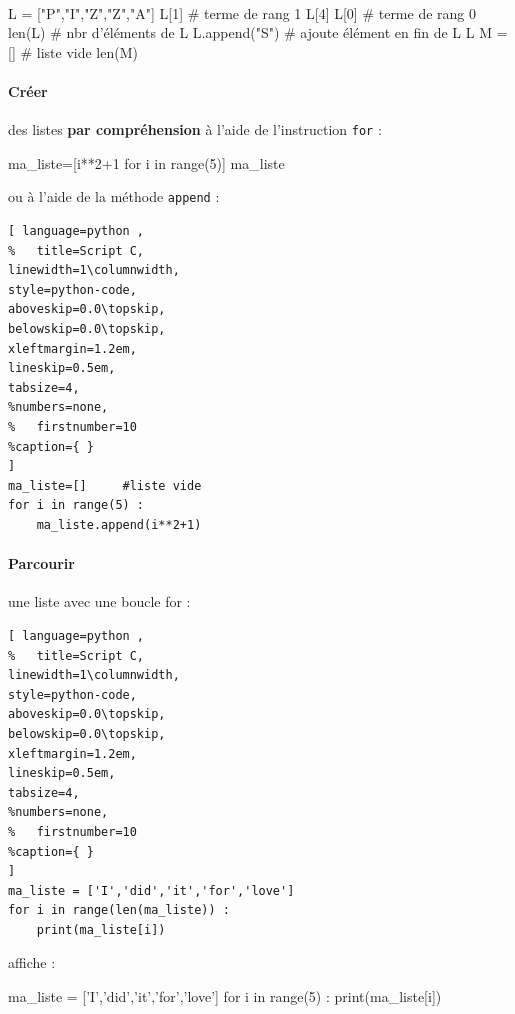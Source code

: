 \documentclass[main.tex]{subfiles}
\begin{document}
\begin{example}\hfill \\
\noindent
\begin{minipage}{0.40\linewidth}
\begin{pyconsole}
L = ["P","I","Z","Z","A"]
L[1] 	# terme de rang 1
L[4]
L[0] 	# terme de rang 0
len(L)	# nbr d'éléments de L
L.append("S") 	
# ajoute élément en fin de L
L
M = [] 	# liste vide
len(M)
\end{pyconsole}
\end{minipage}
\hfill 
\begin{minipage}{0.55\linewidth}
\paragraph{Créer}    des listes \textbf{par compréhension} à l'aide de l'instruction \lstinline|for|  :
\begin{pyconsole}
ma_liste=[i**2+1 for i in range(5)] 
ma_liste 
\end{pyconsole}

ou à l'aide de la méthode  \lstinline|append| :
		
\begin{lstlisting}[ language=python , 
%	title=Script C,   
linewidth=1\columnwidth,
style=python-code,    
aboveskip=0.0\topskip,
belowskip=0.0\topskip,
xleftmargin=1.2em,
lineskip=0.5em,
tabsize=4, 
%numbers=none,
%	firstnumber=10  
%caption={ }
]  
ma_liste=[]		#liste vide
for i in range(5) :
	ma_liste.append(i**2+1)
\end{lstlisting} 

\paragraph{Parcourir}  une liste avec une boucle for :

\begin{lstlisting}[ language=python , 
%	title=Script C,   
linewidth=1\columnwidth,
style=python-code,    
aboveskip=0.0\topskip,
belowskip=0.0\topskip,
xleftmargin=1.2em,
lineskip=0.5em,
tabsize=4, 
%numbers=none,
%	firstnumber=10  
%caption={ }
]  
ma_liste = ['I','did','it','for','love']
for i in range(len(ma_liste)) :
	print(ma_liste[i])
\end{lstlisting} 
affiche :  
\begin{pycode}
ma_liste = ['I','did','it','for','love']
for i in range(5) :
	print(ma_liste[i])
\end{pycode}   
\end{minipage}
\end{example}
\end{document}
